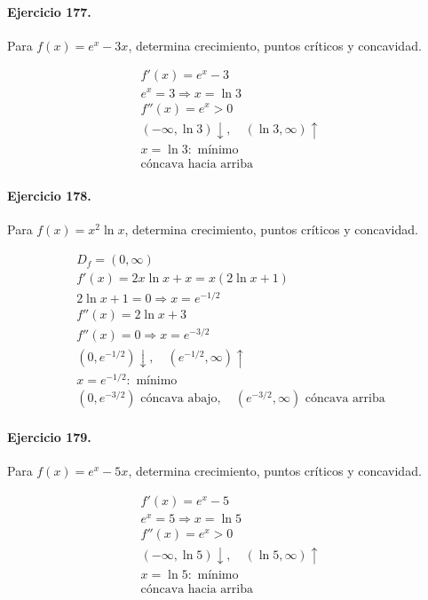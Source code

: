 \documentclass[11pt,a4paper]{article}
\begin{document}
\paragraph{Ejercicio 177.} Para $f(x)=e^x-3x$, determina crecimiento, puntos críticos y concavidad.

\[
\begin{aligned}
f'(x)=e^x-3\\
e^x=3\Rightarrow x=\ln 3\\
f''(x)=e^x>0\\
(-\infty,\ln 3)\downarrow,\quad(\ln 3,\infty)\uparrow\\
x=\ln 3:\text{ mínimo}\\
\text{{cóncava hacia arriba}}
\end{aligned}
\]


\paragraph{Ejercicio 178.} Para $f(x)=x^2\ln x$, determina crecimiento, puntos críticos y concavidad.

\[
\begin{aligned}
D_f=(0,\infty)\\
f'(x)=2x\ln x+x=x(2\ln x+1)\\
2\ln x+1=0\Rightarrow x=e^{-1/2}\\
f''(x)=2\ln x+3\\
f''(x)=0\Rightarrow x=e^{-3/2}\\
(0,e^{-1/2})\downarrow,\quad(e^{-1/2},\infty)\uparrow\\
x=e^{-1/2}:\text{{ mínimo}}\\
(0,e^{-3/2})\text{{ cóncava abajo}},\quad(e^{-3/2},\infty)\text{{ cóncava arriba}}
\end{aligned}
\]


\paragraph{Ejercicio 179.} Para $f(x)=e^x-5x$, determina crecimiento, puntos críticos y concavidad.

\[
\begin{aligned}
f'(x)=e^x-5\\
e^x=5\Rightarrow x=\ln 5\\
f''(x)=e^x>0\\
(-\infty,\ln 5)\downarrow,\quad(\ln 5,\infty)\uparrow\\
x=\ln 5:\text{ mínimo}\\
\text{{cóncava hacia arriba}}
\end{aligned}
\]
\end{document}
